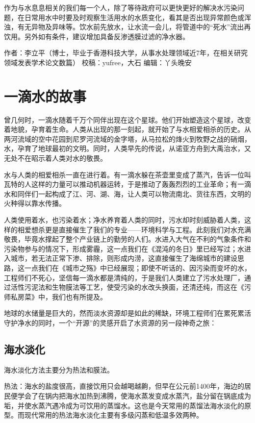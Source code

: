 \documentclass[]{book}
\begin{document}
作为与水息息相关的我们每一个人，除了等待政府可以更快更好的解决水污染问题，在日常用水中时要及时观察生活用水的水质变化，看其是否出现异常颜色或浑浊，有无异物及异味等。饮水前先放水，让水流一会儿，将管道中的``死水''流出再饮用。另外如有条件，建议增加具备反渗透膜过滤的净水器。

作者：李立平（博士，毕业于香港科技大学，从事水处理领域近7年，在相关研究领域发表学术论文数篇）
校稿：yufree，大石 编辑：丫头晚安

\section{一滴水的故事}

曾几何时，一滴水随着千万个同伴出现在这个星球。他们开始塑造这个星球，改变着地貌，孕育着生命。人类从出现的那一刻起，就开始了与水相爱相杀的历史。从两河流域的空中花园到尼罗河流域的金字塔，从马拉松的烽火到牧野之战的硝烟，水，孕育了地球最初的文明。同时，人类早先的传说，从诺亚方舟到大禹治水，又无处不在昭示着人类对水的敬畏。

水与人类的相爱相杀一直在进行着。有一滴水躲在茶壶里变成了蒸汽，告诉一位叫瓦特的人这样的力量可以推动机器运转，于是推动了轰轰烈烈的工业革命；有一滴水和同伴们一起构成了江、河、湖、海，让人类可以物流南北、货往东西，文明的火种得以靠水传播。

人类使用着水，也污染着水；净水养育着人类的同时，污水却时刻威胁着人类，这样的相爱想杀更是直接催生了我们的专业------环境科学与工程。此刻我们对水充满敬畏，毕竟水撑起了整个产业链上的勤劳的人们。水进入大气在不利的气象条件和污染物参与的情况下，形成雾霾，这一点我们在《混沌的冬日》里已经写过；水进入城市，若无法正常下渗、排除，则形成内涝，这直接催生了海绵城市的建设思路，这一点我们在《城市之殇》中已经展现；即使不听话的、因污染而变坏的水，工程师们不死心，坚信每一滴水都是清纯的，于是我们人类建立了污水处理厂，通过活性污泥法和生物膜法等工艺，使受污染的水改头换面，还清还纯，而这在《污师私房菜》中，我们也有所提及。

地球的水储量是巨大的，然而淡水资源却是如此的稀缺，环境工程师们在累死累活守护净水的同时，一个``开源''的灵感开启了水资源的另一段神奇之旅：

\subsection{海水淡化}

海水淡化方法主要分为热法和膜法。

热法：海水的盐度很高，直接饮用只会越喝越齁，但早在公元前1400年，海边的居民便学会了在锅内把海水加热到沸腾，使海水蒸发变成水蒸汽，盐分留在锅底成为垢，并使水蒸汽遇冷成为可饮用的蒸馏水。这也是今天常用的蒸馏法海水淡化的原型。而现代常用的热法海水淡化主要有多级闪蒸和低温多效两种。
\end{document}
